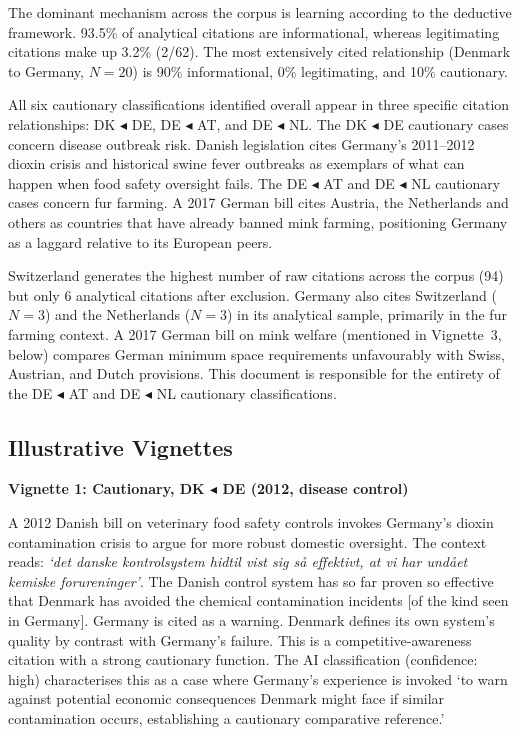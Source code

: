 \documentclass[twocolumn, 10pt, a4paper]{article}
\begin{document}
The dominant mechanism across the corpus is learning according to the deductive
framework. 93.5\% of analytical citations are informational, whereas legitimating
citations make up 3.2\% (2/62). The most extensively cited relationship (Denmark to
Germany, $N = 20$) is 90\% informational, 0\% legitimating, and 10\% cautionary.

All six cautionary classifications identified overall appear in three specific
citation relationships: DK $\blacktriangleleft$ DE, DE $\blacktriangleleft$ AT, and DE $\blacktriangleleft$ NL. The DK $\blacktriangleleft$ DE
cautionary cases concern disease outbreak risk. Danish legislation cites Germany's
2011--2012 dioxin crisis and historical swine fever outbreaks as exemplars of what
can happen when food safety oversight fails. The DE $\blacktriangleleft$ AT and DE $\blacktriangleleft$ NL
cautionary cases concern fur farming. A 2017 German bill cites Austria, the
Netherlands and others as countries that have already banned mink farming, positioning
Germany as a laggard relative to its European peers.

Switzerland generates the highest number of raw citations across the corpus (94) but
only 6 analytical citations after exclusion. Germany also cites Switzerland ($N = 3$)
and the Netherlands ($N = 3$) in its analytical sample, primarily in the fur farming
context. A 2017 German bill on mink welfare (mentioned in Vignette~3, below)
compares German minimum space requirements unfavourably with Swiss, Austrian, and
Dutch provisions. This document is responsible for the entirety of the DE $\blacktriangleleft$ AT
and DE $\blacktriangleleft$ NL cautionary classifications.

\subsection{Illustrative Vignettes}

\noindent\textbf{Vignette 1: Cautionary, DK $\blacktriangleleft$ DE (2012, disease control)}

A 2012 Danish bill on veterinary food safety controls invokes Germany's dioxin
contamination crisis to argue for more robust domestic oversight. The context reads:
\textit{`det danske kontrolsystem hidtil vist sig s\aa{} effektivt, at vi har
und\aa{}et kemiske forureninger'}. The Danish control system has so far proven so
effective that Denmark has avoided the chemical contamination incidents [of the kind
seen in Germany]. Germany is cited as a warning. Denmark defines its own system's
quality by contrast with Germany's failure. This is a competitive-awareness citation
with a strong cautionary function. The AI classification (confidence: high)
characterises this as a case where Germany's experience is invoked `to warn against
potential economic consequences Denmark might face if similar contamination occurs,
establishing a cautionary comparative reference.'
\end{document}
